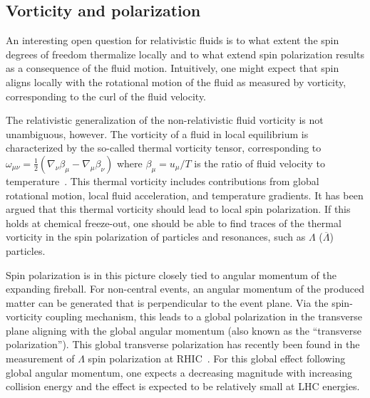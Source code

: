 \subsection{Vorticity and polarization}

An interesting open question for relativistic fluids is to what extent the 
  spin degrees of freedom thermalize locally and to what extend spin 
  polarization results as a consequence of the fluid motion. 
Intuitively, one might expect that spin aligns locally with the rotational 
  motion of the fluid as measured by vorticity, corresponding to the curl 
  of the fluid velocity.

The relativistic generalization of the non-relativistic fluid vorticity is 
  not unambiguous, however. 
The vorticity of a fluid in local equilibrium is characterized by the so-called 
  thermal vorticity tensor, corresponding to $\omega_{\mu\nu} = \frac{1}{2} 
  (\nabla_\nu \beta_\mu - \nabla_\mu \beta_\nu)$ where $\beta_\mu=u_\mu / T$ 
  is the ratio of fluid velocity to temperature~\cite{Becattini:2013fla}. 
This thermal vorticity includes contributions from global rotational motion, 
  local fluid acceleration, and temperature gradients. 
It has been argued that this thermal vorticity should lead to local 
  spin polarization. 
If this holds at chemical freeze-out, one should be able to find traces of the 
  thermal vorticity in the spin polarization of particles and resonances, 
  such as $\Lambda$ ($\overline{\Lambda}$) particles.

Spin polarization is in this picture closely tied to angular momentum of the 
  expanding fireball. 
For non-central events, an angular momentum of the produced matter can be 
  generated that is perpendicular to the event plane. 
Via the spin-vorticity coupling mechanism, this leads to a global polarization 
  in the transverse plane aligning with the global angular momentum (also known 
  as the ``transverse polarization''). 
This global transverse polarization has recently been found in the measurement 
  of $\Lambda$ spin polarization at RHIC~\cite{STAR:2017ckg}. 
For this global effect following global angular momentum, one expects a 
  decreasing magnitude with increasing collision energy and the effect is 
  expected to be relatively small at LHC energies. 


